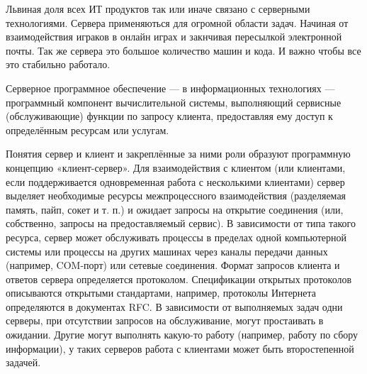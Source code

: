 
Львиная доля всех ИТ продуктов так или иначе связано с серверными технологиями. Сервера применяються для огромной области задач. Начиная от  взаимодействия играков в онлайн играх и закнчивая пересылкой электронной почты. Так же сервера это большое количество машин и кода. И важно чтобы все это стабильно работало. 

 
Серверное программное обеспечение — в информационных технологиях — программный компонент вычислительной системы, выполняющий сервисные (обслуживающие) функции по запросу клиента, предоставляя ему доступ к определённым ресурсам или услугам.
	 	 	
Понятия сервер и клиент и закреплённые за ними роли образуют программную концепцию «клиент-сервер».
Для взаимодействия с клиентом (или клиентами, если поддерживается одновременная работа с несколькими клиентами) сервер выделяет необходимые ресурсы межпроцессного взаимодействия (разделяемая память, пайп, сокет и т. п.) и ожидает запросы на открытие соединения (или, собственно, запросы на предоставляемый сервис). В зависимости от типа такого ресурса, сервер может обслуживать процессы в пределах одной компьютерной системы или процессы на других машинах через каналы передачи данных (например, COM-порт) или сетевые соединения.
Формат запросов клиента и ответов сервера определяется протоколом. Спецификации открытых протоколов описываются открытыми стандартами, например, протоколы Интернета определяются в документах RFC.
В зависимости от выполняемых задач одни серверы, при отсутствии запросов на обслуживание, могут простаивать в ожидании. Другие могут выполнять какую-то работу (например, работу по сбору информации), у таких серверов работа с клиентами может быть второстепенной задачей.



